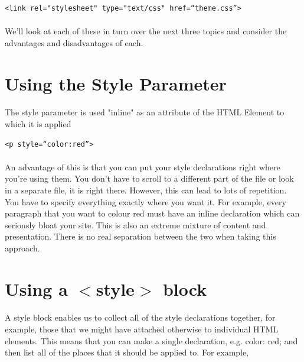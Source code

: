 \begin{lstlisting}
<link rel="stylesheet" type="text/css" href=“theme.css”>
\end{lstlisting}

\paragraph{} We'll look at each of these in turn over the next three topics and consider the advantages and disadvantages of each.


\section{Using the Style Parameter}
\paragraph{} The style parameter is used "inline"  as an attribute of the HTML Element to which it is applied

\begin{lstlisting}
<p style=“color:red”>
\end{lstlisting}

\paragraph{} An advantage of this is that you can put your style declarations right where you’re using them. You don't have to scroll to a different part of the file or look in a separate file, it is right there. However, this can lead to lots of repetition. You have to specify everything exactly where you want it. For example, every paragraph that you want to colour red must have an inline declaration which can seriously bloat your site. This is also an extreme mixture of content and presentation. There is no real separation between the two when taking this approach.


\section{Using a $<$style$>$ block}
\paragraph{} A style block enables us to collect all of the style declarations together, for example, those that we might have attached otherwise to individual HTML elements. This means that you can make a single declaration, e.g. color: red; and then list all of the places that it should be applied to. For example,

